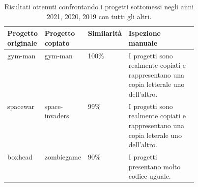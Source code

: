 \begin{table}[h]
    \centering
    \begin{tabular}{|p{0.15\linewidth}|p{0.15\linewidth}|p{0.15\linewidth}|p{}|}
        \hline
        \textbf{Progetto originale} & \textbf{Progetto copiato} & \textbf{Similarità} & \textbf{Ispezione manuale} \\ [0.5ex] 
        \hline\hline
        gym-man & gym-man & 100\% & I progetti sono realmente copiati e rappresentano una copia letterale uno dell'altro. \\
        \hline
        spacewar & space-invaders & 99\% & I progetti sono realmente copiati e rappresentano una copia leterale uno dell'altro. \\
        \hline
        boxhead & zombiegame & 90\% & I progetti presentano molto codice uguale. \\
        \hline
    \end{tabular}
    \caption{Risultati ottenuti confrontando i progetti sottomessi negli anni 2021, 2020, 2019 con tutti gli altri.}
    \label{table:results}
\end{table}



